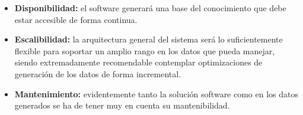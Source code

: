 \begin{itemize}
  \item \textbf{Disponibilidad:} el software generará una base del 
	conocimiento que debe estar accesible de forma continua.
  \item \textbf{Escalibilidad:} la arquitectura general del sistema 
	será lo suficientemente flexible para soportar un amplio
	rango en los datos que pueda manejar, siendo extremadamente
	recomendable contemplar optimizaciones de generación de los 
	datos de forma incremental.
  \item \textbf{Mantenimiento:} evidentemente tanto la solución software 
	como en los datos generados se ha de tener muy en cuenta su
	mantenibilidad.
\end{itemize}




